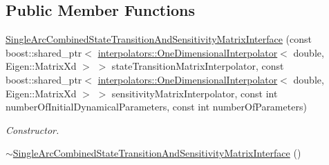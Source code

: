 \subsection*{Public Member Functions}
\begin{DoxyCompactItemize}
\item 
\hyperlink{classtudat_1_1propagators_1_1SingleArcCombinedStateTransitionAndSensitivityMatrixInterface_a967060f435dd91e23c70a3586086cd63}{Single\+Arc\+Combined\+State\+Transition\+And\+Sensitivity\+Matrix\+Interface} (const boost\+::shared\+\_\+ptr$<$ \hyperlink{classtudat_1_1interpolators_1_1OneDimensionalInterpolator}{interpolators\+::\+One\+Dimensional\+Interpolator}$<$ double, Eigen\+::\+Matrix\+Xd $>$ $>$ state\+Transition\+Matrix\+Interpolator, const boost\+::shared\+\_\+ptr$<$ \hyperlink{classtudat_1_1interpolators_1_1OneDimensionalInterpolator}{interpolators\+::\+One\+Dimensional\+Interpolator}$<$ double, Eigen\+::\+Matrix\+Xd $>$ $>$ sensitivity\+Matrix\+Interpolator, const int number\+Of\+Initial\+Dynamical\+Parameters, const int number\+Of\+Parameters)
\begin{DoxyCompactList}\small\item\em Constructor. \end{DoxyCompactList}\item 
\hyperlink{classtudat_1_1propagators_1_1SingleArcCombinedStateTransitionAndSensitivityMatrixInterface_a1c54bf1d48691f3a0204ff6014f04427}{$\sim$\+Single\+Arc\+Combined\+State\+Transition\+And\+Sensitivity\+Matrix\+Interface} ()\hypertarget{classtudat_1_1propagators_1_1SingleArcCombinedStateTransitionAndSensitivityMatrixInterface_a1c54bf1d48691f3a0204ff6014f04427}{}\label{classtudat_1_1propagators_1_1SingleArcCombinedStateTransitionAndSensitivityMatrixInterface_a1c54bf1d48691f3a0204ff6014f04427}


\end{DoxyCompactItemize}
